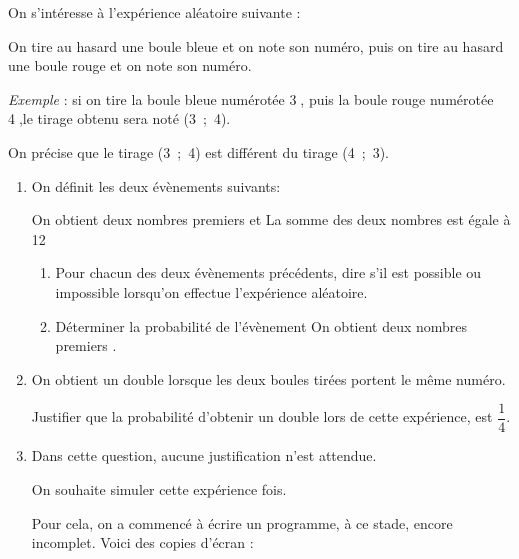 \documentclass[10pt]{article}
\begin{document}
On s'intéresse à l'expérience aléatoire suivante :

\og On tire au hasard une boule bleue et on note son numéro, puis on tire au hasard une boule rouge et on note son numéro. \fg

\emph{Exemple} : si on tire la boule bleue numérotée \textcircled{3}, puis la boule rouge numérotée \textcircled{4},le tirage obtenu sera noté (3~;~4).

On précise que le tirage (3~;~4) est différent du tirage (4~;~3).

\medskip

\begin{enumerate}
\item On définit les deux évènements suivants:

\og On obtient deux nombres premiers \fg{} et \og La somme des deux nombres est égale à 12 \fg
	\begin{enumerate}
		\item Pour chacun des deux évènements précédents, dire s'il est possible ou impossible lorsqu'on effectue l'expérience aléatoire.
		\item Déterminer la probabilité de l'évènement \og On obtient deux nombres premiers \fg.
	\end{enumerate}
\item On obtient un \og double \fg{} lorsque les deux boules tirées portent le même numéro. 

Justifier que la probabilité d'obtenir un \og double \fg{} lors de cette expérience, est $\dfrac{1}{4}$.
\item Dans cette question, aucune justification n'est attendue. 

On souhaite simuler cette expérience  fois.

Pour cela, on a commencé à écrire un programme, à ce stade, encore incomplet. Voici des copies d'écran :


\end{enumerate}
\end{document}
